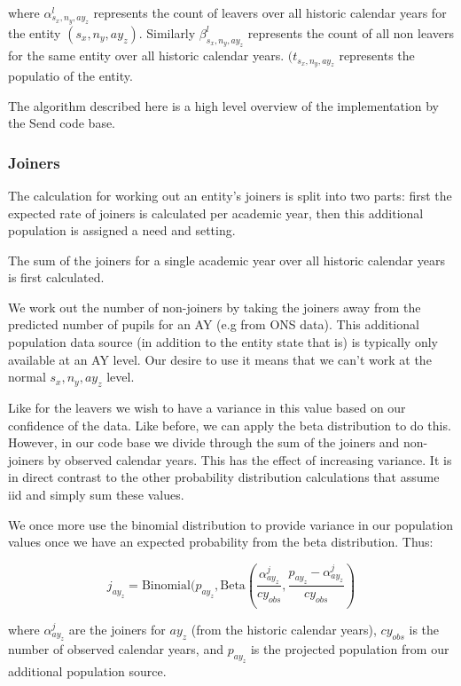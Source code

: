 \documentclass[margin=5mm]{article}
\begin{document}
where $\alpha^l_{s_x,n_y,ay_z}$ represents the count of leavers over
all historic calendar years for the entity $({s_x,n_y,ay_z})$.
Similarly $\beta^l_{s_x,n_y,ay_z}$ represents the count of all non
leavers for the same entity over all historic calendar years.
$(t_{s_x,n_y,ay_z}$ represents the populatio of the entity.

The algorithm described here is a high level overview of the
implementation by the Send code base.

\subsubsection{Joiners}

The calculation for working out an entity's joiners is split into two
parts: first the expected rate of joiners is calculated per academic
year, then this additional population is assigned a need and setting.

The sum of the joiners for a single academic year over all historic
calendar years is first calculated.

We work out the number of non-joiners by taking the joiners away from
the predicted number of pupils for an AY (e.g from ONS data).  This
additional population data source (in addition to the entity state
that is) is typically only available at an AY level.  Our desire to
use it means that we can't work at the normal ${s_x,n_y,ay_z}$
level.

Like for the leavers we wish to have a variance in this value based on
our confidence of the data.  Like before, we can apply the beta
distribution to do this.  However, in our code base we divide through
the sum of the joiners and non-joiners by observed calendar years.
This has the effect of increasing variance.  It is in direct contrast
to the other probability distribution calculations that assume iid and
simply sum these values.

We once more use the binomial distribution to provide variance in
our population values once we have an expected probability from the
beta distribution.  Thus:

\begin{equation*}
j_{ay_z} = \text{Binomial}(p_{ay_z},
\text{Beta}(\frac{\alpha^j_{ay_z}}{cy_{obs}},\frac{p_{ay_z} -\alpha^j_{ay_z}}{cy_{obs}})
\end{equation*}

where $\alpha^j_{ay_z}$ are the joiners for $ay_z$ (from the
historic calendar years), $cy_{obs}$ is the number of observed
calendar years, and $p_{ay_z}$ is the projected population from our
additional population source.
\end{document}
